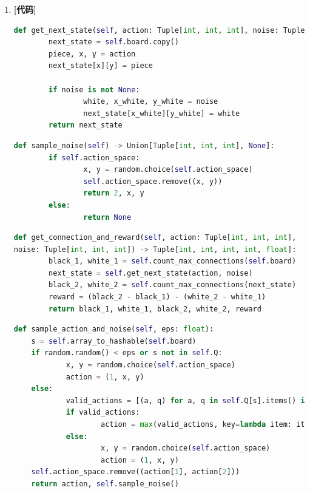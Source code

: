 \documentclass{article}
\begin{document}
\begin{enumerate}[label=(\alph*), start=1]
    \item \textbf{[代码]} %
    \begin{lstlisting}[language=Python]
def get_next_state(self, action: Tuple[int, int, int], noise: Tuple[int, int, int]) -> np.array:
		next_state = self.board.copy() 
		piece, x, y = action
		next_state[x][y] = piece

		if noise is not None:
				white, x_white, y_white = noise
				next_state[x_white][y_white] = white
		return next_state
    \end{lstlisting}
    
    \begin{lstlisting}[language=Python]
def sample_noise(self) -> Union[Tuple[int, int, int], None]:
		if self.action_space:
				x, y = random.choice(self.action_space)
				self.action_space.remove((x, y))
				return 2, x, y
		else:
				return None
    \end{lstlisting}

    \begin{lstlisting}[language=Python]
def get_connection_and_reward(self, action: Tuple[int, int, int], 
noise: Tuple[int, int, int]) -> Tuple[int, int, int, int, float]:
		black_1, white_1 = self.count_max_connections(self.board)
		next_state = self.get_next_state(action, noise)
		black_2, white_2 = self.count_max_connections(next_state)
		reward = (black_2 - black_1) - (white_2 - white_1)
		return black_1, white_1, black_2, white_2, reward
    \end{lstlisting}

    \begin{lstlisting}[language=Python]
def sample_action_and_noise(self, eps: float):
    s = self.array_to_hashable(self.board)
    if random.random() < eps or s not in self.Q:
    		x, y = random.choice(self.action_space)
    		action = (1, x, y)
    else:
    		valid_actions = [(a, q) for a, q in self.Q[s].items() if (a[1], a[2]) in self.action_space]
    		if valid_actions:
    				action = max(valid_actions, key=lambda item: item[1])[0]
    		else:
    				x, y = random.choice(self.action_space)
    				action = (1, x, y)
    self.action_space.remove((action[1], action[2]))
    return action, self.sample_noise()
    \end{lstlisting}


\end{enumerate}
\end{document}
